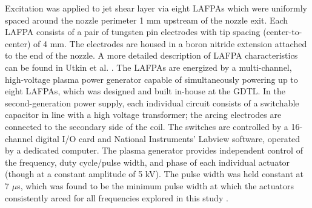 \documentclass[english]{aiaa-tc}
\begin{document}
Excitation was applied to jet shear layer via eight LAFPAs which were uniformly spaced around the nozzle perimeter 1 mm upstream of the nozzle exit.
Each LAFPA consists of a pair of tungsten pin electrodes with tip spacing (center-to-center) of 4 mm.
The electrodes are housed in a boron nitride extension attached to the end of the nozzle. A more detailed description of LAFPA characteristics can be found in Utkin et al. \cite{uyg2007-1}.
The LAFPAs are energized by a multi-channel, high-voltage plasma power generator capable of simultaneously powering up to eight LAFPAs, which was designed and built in-house at the GDTL.
In the second-generation power supply, each individual circuit consists of a switchable capacitor in line with a high voltage transformer; the arcing electrodes are connected to the secondary side of the coil.
The switches are controlled by a 16-channel digital I/O card and National Instruments' Labview software, operated by a dedicated computer.
The plasma generator provides independent control of the frequency, duty cycle/pulse width, and phase of each individual actuator (though at a constant amplitude of 5 kV).
The pulse width was held constant at 7 $\mu$s, which was found to be the minimum pulse width at which the actuators consistently arced for all frequencies explored in this study \cite{hkfs-2011}.
\end{document}

